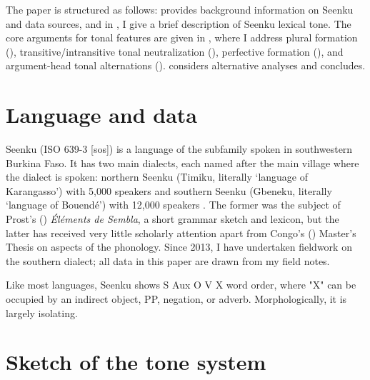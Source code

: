 \documentclass[output=paper]{langsci/langscibook}
\begin{document}
The paper is structured as follows:  provides background information on Seenku and data sources, and in , I give a brief description of Seenku lexical tone. The core arguments for tonal features are given in , where I address plural formation (), transitive/intransitive tonal neutralization (), perfective formation (), and argument-head tonal alternations ().  considers alternative analyses and  concludes.





\section{Language and data}\label{sec:mcpherson:SecBackground}


Seenku (ISO 639-3 [sos]) is a  language of the  subfamily spoken in southwestern Burkina Faso. It has two main dialects, each named after the main village where the dialect is spoken: northern Seenku (Timiku, literally `language of Karangasso') with 5,000 speakers and southern Seenku (Gbeneku, literally `language of Bouend\'e') with 12,000 speakers \citep{Ethnologue}. The former was the subject of Prost's (\citeyear{Prost71}) {\it \'El\'ements de Sembla}, a short grammar sketch and lexicon, but the latter has received very little scholarly attention apart from Congo's (\citeyear{Congo13}) Master's Thesis on aspects of the phonology. Since 2013, I have undertaken fieldwork on the southern dialect; all data in this paper are drawn from my field notes.

Like most  languages, Seenku shows S Aux O V X word order, where "X" can be occupied by an indirect object, PP, negation, or adverb. Morphologically, it is largely isolating.

\section{Sketch of the tone system}\label{sec:mcpherson:SecTone}
\end{document}
